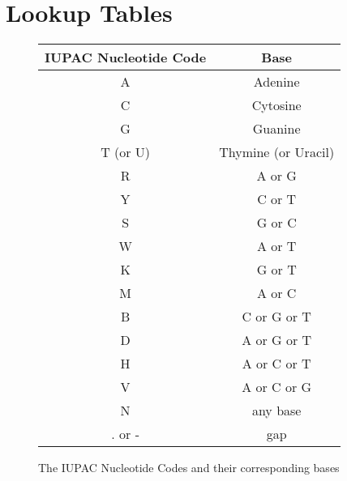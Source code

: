 \documentclass[a4]{article}
\begin{document}
\section{Lookup Tables}
	\begin{figure}[h]
		\centering
		\begin{tabular}{cc}
			\hline
			IUPAC Nucleotide Code & Base \\ 
			\hline
			A & Adenine \\ 
			C & Cytosine \\ 
			G & Guanine \\ 
			T (or U) & Thymine (or Uracil) \\ 
			R & A or G \\ 
			Y & C or T \\ 
			S & G or C \\ 
			W & A or T \\ 
			K & G or T \\ 
			M & A or C \\ 
			B & C or G or T \\ 
			D & A or G or T \\ 
			H & A or C or T \\ 
			V & A or C or G \\ 
			N & any base \\ 
			. or - & gap\\
			\hline
		\end{tabular}
		\caption{The IUPAC Nucleotide Codes and their corresponding bases}
		\label{nucleotideCodeTable}
	\end{figure} 
\end{document}
